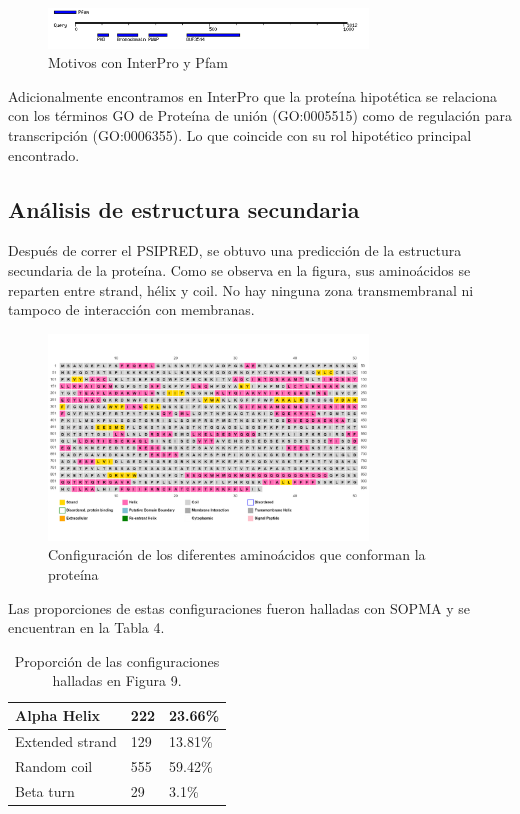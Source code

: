 \documentclass[journal,transmag]{IEEEtran}
\begin{document}
\begin{figure}[!h]
	\center
	\includegraphics[width=8.5cm]{imagenes/motivos.png}
	\caption{Motivos con InterPro y Pfam}
	\label{9}
\end{figure}

Adicionalmente encontramos en InterPro que la proteína hipotética se relaciona con los términos GO de Proteína de unión (GO:0005515) como de regulación para transcripción (GO:0006355). Lo que coincide con su rol hipotético principal encontrado. 

\subsection{\textbf{ Análisis de estructura secundaria}}

Después de correr el PSIPRED, se obtuvo una predicción de la estructura secundaria de la proteína. Como se observa en la figura, sus aminoácidos se reparten entre strand, hélix y coil. No hay ninguna zona transmembranal ni tampoco de interacción con membranas. 

\begin{figure}[!h]
	\center
	\includegraphics[width=8.5cm]{imagenes/secundaria.png}
	\caption{Configuración de los diferentes aminoácidos que conforman la proteína}
	\label{10}
\end{figure}

Las proporciones de estas configuraciones fueron halladas con SOPMA y se encuentran en la Tabla 4. 

\begin{table}[!h]
	\begin{tabular}{|l|l|l|}
	\hline
	Alpha Helix & 222 & 23.66\%  \\ \hline
	Extended strand & 129 & 13.81\%  \\ \hline
	Random coil& 555 & 59.42\%  \\ \hline
	Beta turn & 29 & 3.1\%  \\ \hline
	\end{tabular}
	\caption{Proporción de las configuraciones halladas en Figura 9. }
	\end{table}
\end{document}
